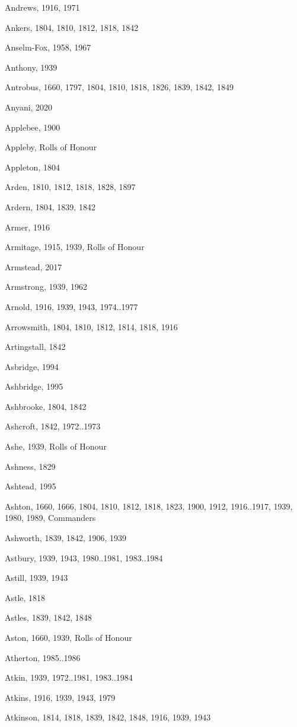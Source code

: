 \begin{theindex}
\item Andrews, 1916, 1971
\item Ankers, 1804, 1810, 1812, 1818, 1842
\item Anselm-Fox, 1958, 1967
\item Anthony, 1939
\item Antrobus, 1660, 1797, 1804, 1810, 1818, 1826, 1839, 1842, 1849
\item Anyani, 2020
\item Applebee, 1900
\item Appleby, Rolls of Honour
\item Appleton, 1804
\item Arden, 1810, 1812, 1818, 1828, 1897
\item Ardern, 1804, 1839, 1842
\item Armer, 1916
\item Armitage, 1915, 1939, Rolls of Honour
\item Armstead, 2017
\item Armstrong, 1939, 1962
\item Arnold, 1916, 1939, 1943, 1974..1977
\item Arrowsmith, 1804, 1810, 1812, 1814, 1818, 1916
\item Artingstall, 1842
\item Asbridge, 1994
\item Ashbridge, 1995
\item Ashbrooke, 1804, 1842
\item Ashcroft, 1842, 1972..1973
\item Ashe, 1939, Rolls of Honour
\item Ashness, 1829
\item Ashtead, 1995
\item Ashton, 1660, 1666, 1804, 1810, 1812, 1818, 1823, 1900, 1912, 1916..1917, 1939, 1980, 1989, Commanders
\item Ashworth, 1839, 1842, 1906, 1939
\item Astbury, 1939, 1943, 1980..1981, 1983..1984
\item Astill, 1939, 1943
\item Astle, 1818
\item Astles, 1839, 1842, 1848
\item Aston, 1660, 1939, Rolls of Honour
\item Atherton, 1985..1986
\item Atkin, 1939, 1972..1981, 1983..1984
\item Atkins, 1916, 1939, 1943, 1979
\item Atkinson, 1814, 1818, 1839, 1842, 1848, 1916, 1939, 1943

\end{theindex}
